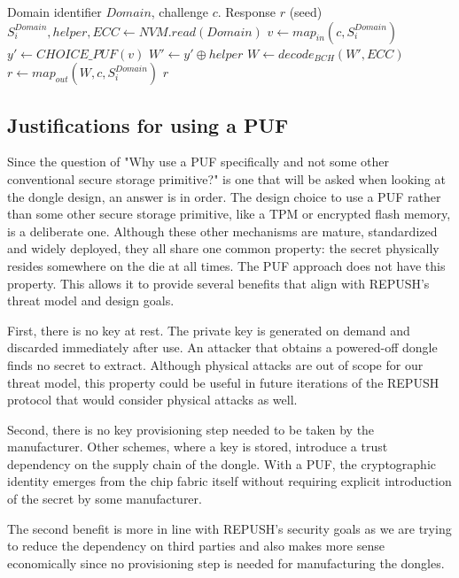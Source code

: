 \begin{algorithm}[ht!]
\caption{$query_{BCH}(Domain, c)$}
\begin{algorithmic}[1]
    \Require Domain identifier $Domain$, challenge $c$.
    \Ensure  Response $r$ (seed) 
    \State $S_i^{Domain},helper,ECC \leftarrow NVM.read(Domain)$
    \State $v \leftarrow map_{in}(c, S_i^{Domain})$
    \State $y' \leftarrow CHOICE\_PUF(v)$
    \State $W' \leftarrow y' \oplus helper $
    \State $W \leftarrow decode_{BCH}(W', ECC)$
    \State $r \leftarrow map_{out}(W,c, S_i^{Domain})$ 
    \State \Return $r$
\end{algorithmic}
\label{alg:PUF-BCH-Query}
\end{algorithm}

\subsection{Justifications for using a PUF}
Since the question of "Why use a PUF specifically and not some other conventional secure storage primitive?" is one that will be asked when looking at the dongle design, an answer is in order. The design choice to use a PUF rather than some other secure storage primitive, like a TPM or encrypted flash memory, is a deliberate one. Although these other mechanisms are mature, standardized and widely deployed, they all share one common property: the secret physically resides somewhere on the die at all times. The PUF approach does not have this property. This allows it to provide several benefits that align with REPUSH's threat model and design goals.

First, there is no key at rest. The private key is generated on demand and discarded immediately after use. An attacker that obtains a powered-off dongle finds no secret to extract. Although physical attacks are out of scope for our threat model, this property could be useful in future iterations of the REPUSH protocol that would consider physical attacks as well.

Second, there is no key provisioning step needed to be taken by the manufacturer. Other schemes, where a key is stored, introduce a trust dependency on the supply chain of the dongle. With a PUF, the cryptographic identity emerges from the chip fabric itself without requiring explicit introduction of the secret by some manufacturer.

The second benefit is more in line with REPUSH's security goals as we are trying to reduce the dependency on third parties and also makes more sense economically since no provisioning step is needed for manufacturing the dongles.

